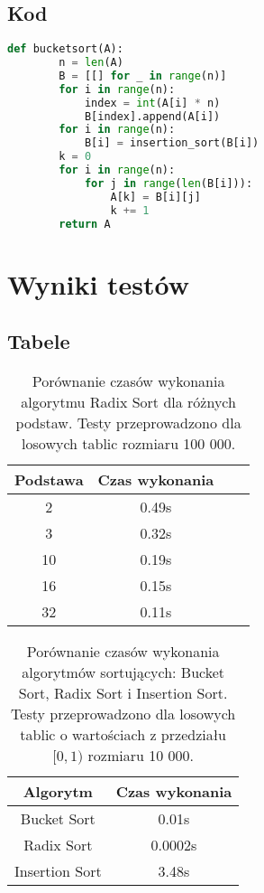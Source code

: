 \documentclass{article}
\begin{document}
\subsection{Kod}
\begin{lstlisting}[language=Python]
    def bucketsort(A):
        n = len(A)
        B = [[] for _ in range(n)]
        for i in range(n):
            index = int(A[i] * n)
            B[index].append(A[i])
        for i in range(n):
            B[i] = insertion_sort(B[i])
        k = 0
        for i in range(n):
            for j in range(len(B[i])):
                A[k] = B[i][j]
                k += 1
        return A
\end{lstlisting}

\section{Wyniki testów}
\subsection{Tabele}
\begin{table}[h]
    \centering
    \begin{tabular}{|c|c|c|c|}
    \hline
    Podstawa & Czas wykonania\\
    \hline
    2 & 0.49s \\
    3 & 0.32s \\
    10 & 0.19s \\
    16 & 0.15s \\
    32 & 0.11s \\
    \hline
    \end{tabular}
    \caption{Porównanie czasów wykonania algorytmu Radix Sort dla różnych podstaw. Testy przeprowadzono dla losowych tablic rozmiaru 100 000.}
\end{table}

\begin{table}[H]
    \centering
    \begin{tabular}{|c|c|}
    \hline
    Algorytm & Czas wykonania\\
    \hline
    Bucket Sort & 0.01s \\
    Radix Sort & 0.0002s \\
    Insertion Sort & 3.48s \\
    \hline
    \end{tabular}
    \caption{Porównanie czasów wykonania algorytmów sortujących: Bucket Sort, Radix Sort i Insertion Sort. Testy przeprowadzono dla losowych tablic o wartościach z przedziału {$[0,1)$} rozmiaru 10 000.}
\end{table}
\end{document}
